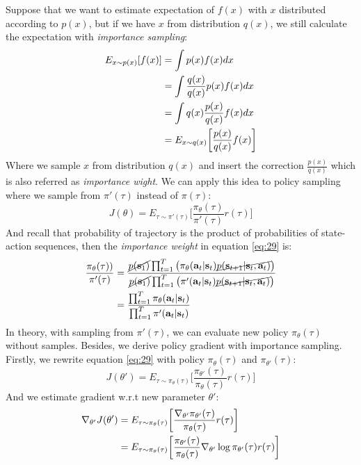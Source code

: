\documentclass{tufte-handout}
\newcommand{\s}{\mathbf{s}}
\newcommand{\act}{\mathbf{a}}
\begin{document}
Suppose that we want to estimate expectation of $f(x)$ with $x$ distributed according to $p(x)$, but if we have $x$ from distribution $q(x)$, we still calculate the expectation with \emph{importance sampling}:
\begin{align}
\label{eq:28}
E_{x \sim p(x)} [f(x)] & = \int p(x) f(x) dx \notag \\
& = \int \frac{q(x)}{q(x)} p(x) f(x) dx \notag \\
& = \int q(x) \frac{p(x)}{q(x)} f(x) dx \notag \\
& = E_{x \sim q(x)} \bigg[\frac{p(x)}{q(x)} f(x)\bigg]
\end{align}
Where we sample $x$ from distribution $q(x)$ and insert the correction $\frac{p(x)}{q(x)}$ which is also referred as \emph{importance wight}. We can apply this idea to policy sampling where we sample from $\pi'(\tau)$ instead of $\pi(\tau)$:
\begin{equation}
\label{eq:29}
J(\theta) = E_{\tau \sim \pi'(\tau)} \bigg[\frac{\pi_\theta(\tau)}{\pi'(\tau)} r(\tau) \bigg]
\end{equation}
And recall that probability of trajectory is the product of probabilities of state-action sequences, then the \emph{importance weight} in equation \ref{eq:29} is:
\begin{align}
\label{eq:30}
\frac{\pi_\theta (\tau))}{\pi'(\tau)} &  =  \frac{\cancel{p(\s_1)}\prod _{t=1}^T \big(\pi_\theta (\act_t | \s_t) \cancel{p(\s_{t+1} | \s_t, \act_t)}\big)}
{\cancel{p(\s_1)}\prod _{t=1}^T \big(\pi' (\act_t | \s_t) \cancel{p(\s_{t+1} | \s_t, \act_t)}\big)} \notag \\
& =  \frac{\prod _{t=1}^T \pi_\theta (\act_t | \s_t)}{\prod _{t=1}^T \pi' (\act_t | \s_t)}
\end{align}
In theory, with sampling from $\pi'(\tau)$, we can evaluate new policy $\pi_\theta(\tau)$ without samples. Besides, we derive policy gradient with importance sampling. Firstly, we rewrite equation \ref{eq:29} with policy $\pi_\theta (\tau)$ and $\pi_{\theta'} (\tau) $:
\begin{equation}
\label{eq:31}
J(\theta') = E_{\tau \sim \pi_\theta(\tau)} \bigg[\frac{\pi_{\theta'}(\tau)}{\pi_\theta(\tau)} r(\tau) \bigg]
\end{equation}
And we estimate gradient w.r.t new parameter $\theta'$:
\begin{align}
\label{eq:32}
\nabla _ {\theta'} J(\theta') & = E _{\tau \sim \pi_{\theta}(\tau)} \bigg[\frac{\nabla _{\theta'} \pi_{\theta'}(\tau)}{\pi_\theta(\tau)} r(\tau) \bigg] \notag \\
& = E _{\tau \sim \pi_{\theta}(\tau)} \bigg[\frac{\pi_{\theta'} (\tau)}{\pi_\theta(\tau)}\nabla _{\theta'} \log \pi_{\theta'}(\tau) r(\tau) \bigg]
\end{align}
\end{document}
